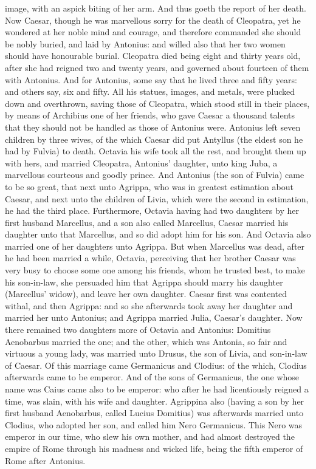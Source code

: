 \documentclass{book}
\begin{document}
image, with an aspick biting of her arm. And thus goeth the report of her death. 
Now Caesar, though he was marvellous sorry for the death of
Cleopatra, yet he wondered at her noble mind and courage, and therefore
commanded she should be nobly buried, and laid by Antonius: and willed also
that her two women should have honourable burial. 
  Cleopatra died being eight and thirty
years old, after she had reigned two and twenty years, and governed about
fourteen of them with Antonius. And for Antonius, some say that he lived three
and fifty years: and others say, six and fifty. All his statues, images, and
metals, were plucked down and overthrown, saving those of Cleopatra, which
stood still in their places, by means of Archibius one of her friends, who
gave Caesar a thousand talents that they should not be handled as those of
Antonius were. 
Antonius left seven children by three wives, of the which Caesar did
put Antyllus (the eldest son he had by Fulvia) to death. 
Octavia  his wife took all the rest, and
brought them up with hers, and married Cleopatra, Antonius' daughter, unto
king Juba, a marvellous courteous and goodly prince. And Antonius (the son of
Fulvia) came to be so great, that next unto Agrippa, who was in greatest
estimation about Caesar, and next unto the children of Livia, which were the
second in estimation, he had the third place. Furthermore, Octavia having had
two daughters by her first husband Marcellus, and a son also called Marcellus,
Caesar married his daughter unto that Marcellus, and so did adopt him for his son. And Octavia
also married one of her daughters unto Agrippa. But when Marcellus was dead,
after he had been married a while, Octavia, perceiving that her brother Caesar
was very busy to choose some one among his friends, whom he trusted best, to
make his son-in-law, she persuaded him that Agrippa should marry his daughter
(Marcellus' widow), and leave her own daughter. Caesar first was contented
withal, and then Agrippa: and so she afterwards took away her daughter and
married her unto Antonius; and Agrippa married Julia, Caesar's daughter. Now
there remained two daughters more of Octavia and Antonius: Domitius Aenobarbus
married the one; and the other, which was Antonia, so fair and virtuous a
young lady, was married unto Drusus, the son of Livia, and son-in-law of
Caesar. Of this marriage came Germanicus and Clodius: of the which,
Clodius afterwards came to be emperor. And of the sons of Germanicus, the one
whose name was Caius came also to be emperor: who after he had
licentiously reigned a time, was slain, with his wife and daughter. Agrippina
also (having a son by her first husband Aenobarbus, called Lucius Domitius)
was afterwards married unto Clodius, who adopted her son, and called him Nero
Germanicus. This Nero was emperor in our time, who slew his own mother, and
had almost destroyed the empire of Rome through his madness and wicked life,
being the fifth emperor of Rome after Antonius.

\endprosa
\end{document}
